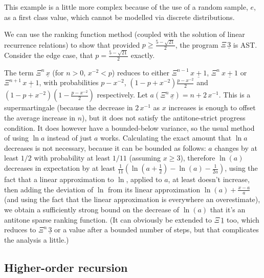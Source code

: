 This example is a little more complex because of the use of a random sample, $e$, as a first class value, which cannot be modelled via discrete distributions. 

We can use the ranking function method (coupled with the solution of linear recurrence relations) to show that provided $p \geq \frac{5 - \sqrt{21}}{2}$, the program $\Xi \, \underline 3$ is AST. 
Consider the edge case, that $p = \frac{5 - \sqrt{21}}{2}$ exactly.

The term $\Xi^n\, \underline x$ (for $n > 0$, $x^{-2} < p$) reduces to either $\Xi^{n-1}\, \underline{x+1}$, $\Xi^n\ \underline{x+1}$ or $\Xi^{n+1}\, \underline{x+1}$, 
with probabilities $p-x^{-2}$, $(1-p+x^{-2})\frac{p-x^{-2}}{2}$ and $(1-p+x^{-2})(1-\frac{p-x^{-2}}{2})$ respectively. 
Let $a(\Xi^n\, \underline x) = n + 2 \, x^{-1}$. 
This is a supermartingale (because the decrease in $2 \, x^{-1}$ as $x$ increases is enough to offset the average increase in $n$), but it does not satisfy the antitone-strict progress condition. 
It does however have a bounded-below variance, so the usual method of using $\ln a$ instead of just $a$ works. 
Calculating the exact amount that $\ln a$ decreases is not necessary, because it can be bounded as follows: 
$a$ changes by at least $1/2$ with probability at least $1/11$ (assuming $x \geq 3$), 
therefore $\ln(a)$ decreases in expectation by at least $\frac{1}{11}(\ln(a+\frac{1}{2}) - \ln(a) -\frac 1 {2a})$, 
using the fact that a linear approximation to $\ln$, applied to $a$, at least doesn't increase, 
then adding the deviation of $\ln$ from its linear approximation $\ln(a) + \frac{x-a}{a}$ 
(and using the fact that the linear approximation is everywhere an overestimate), 
we obtain a sufficiently strong bound on the decrease of $\ln(a)$ that it's an antitone sparse ranking function. 
(It can obviously be extended to $\Xi\, \underline 1$ too, which reduces to $\Xi^n\, \underline 3$ or a value after a bounded number of steps, but that complicates the analysis a little.)

\subsection*{Higher-order recursion}

